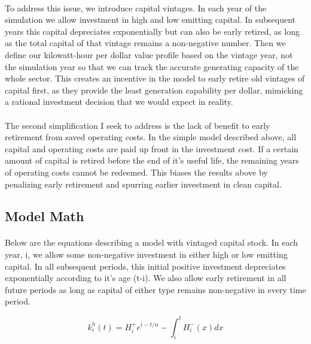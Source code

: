 \documentclass{easychithesis}
\begin{document}
\paragraph{} To address this issue, we introduce capital vintages. In each year of the simulation we allow investment in high and low emitting capital. In subsequent years this capital depreciates exponentially but can also be early retired, as long as the total capital of that vintage remains a non-negative number. Then we define our kilowatt-hour per dollar value profile based on the vintage year, not the simulation year so that we can track the accurate generating capacity of the whole sector. This creates an incentive in the model to early retire old vintages of capital first, as they provide the least generation capability per dollar, mimicking a rational investment decision that we would expect in reality. 

\paragraph{} The second simplification I seek to address is the lack of benefit to early retirement from saved operating costs. In the simple model described above, all capital and operating costs are paid up front in the investment cost. If a certain amount of capital is retired before the end of it's useful life, the remaining years of operating costs cannot be redeemed. This biases the results above by penalizing early retirement and spurring earlier investment in clean capital. 


\subsection{Model Math}

\paragraph{} Below are the equations describing a model with vintaged capital stock. In each year, i, we allow some non-negative investment in either high or low emitting capital. In all subsequent periods, this initial positive investment depreciates exponentially according to it's age (t-i). We also allow early retirement in all future periods as long as capital of either type remains non-negative in every time period. 

\begin{equation}
k_i^h(t) = H_i^+ e^{i-t/n} - \int_i^t H^-_i(x)dx
\end{equation}
\end{document}
